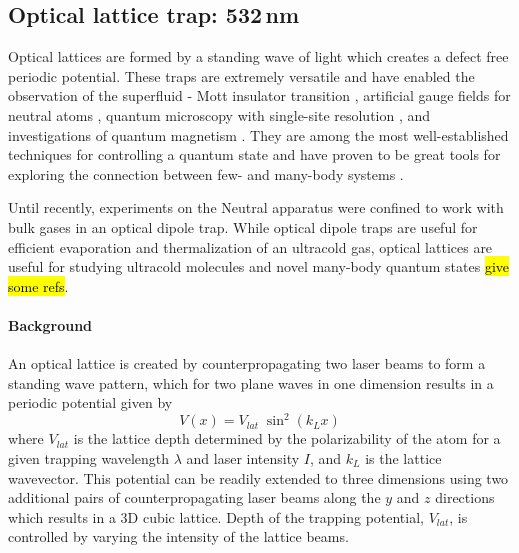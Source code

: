 \subsection{Optical lattice trap: 532\,nm} \label{ssec:532sys}
Optical lattices are formed by a standing wave of light which creates a defect free periodic potential.
These traps are extremely versatile and have enabled the observation of the superfluid - Mott insulator transition \cite{Greiner2002}, artificial gauge fields for neutral atoms \cite{Lin2011}, quantum microscopy with single-site resolution \cite{Bakr2009}, and investigations of quantum magnetism \cite{Hart2015,Greif2015}. 
They are among the most well-established techniques for controlling a quantum state and have proven to be great tools for exploring the connection between few- and many-body systems \cite{Bloch2008}.

Until recently, experiments on the Neutral apparatus were confined to work with bulk gases in an optical dipole trap.
While optical dipole traps are useful for efficient evaporation and thermalization of an ultracold gas, optical lattices are useful for studying ultracold molecules and novel many-body quantum states \hl{give some refs}.

\paragraph{Background} \label{sec:latBackground}
An optical lattice is created by counterpropagating two laser beams to form a standing wave pattern, which for two plane waves in one dimension results in a periodic potential given by 
	\begin{equation}
		 V(x) = V_{lat} \; \sin^2(k_L x)
	\end{equation}
where $V_{lat}$ is the lattice depth determined by the polarizability of the atom for a given trapping wavelength $\lambda$ and laser intensity $I$, and $k_L$ is the lattice wavevector.
This potential can be readily extended to three dimensions using two additional pairs of counterpropagating laser beams along the $y$ and $z$ directions which results in a 3D cubic lattice.
Depth of the trapping potential, $V_{lat}$, is controlled by varying the intensity of the lattice beams.

